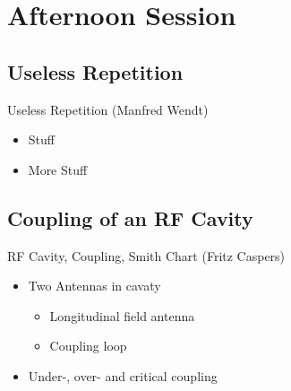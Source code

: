 \documentclass{beamer}
\begin{document}
\section{Afternoon Session}
\subsection{Useless Repetition}
\begin{frame}[t,fragile]{Useless Repetition (Manfred Wendt)}
\begin{itemize}
\item Stuff
\item More Stuff
\end{itemize}
\end{frame}

\subsection{Coupling of an RF Cavity}
\begin{frame}[t,fragile]{RF Cavity, Coupling, Smith Chart (Fritz Caspers)}
\begin{itemize}
\item  Two Antennas in cavaty
\begin{itemize}
\item Longitudinal field antenna
\item Coupling loop
\end{itemize}
\item Under-, over- and critical coupling
\end{itemize}
\begin{figure}
  \centering
  \;
  \;
\end{figure}
\end{frame}
\end{document}
